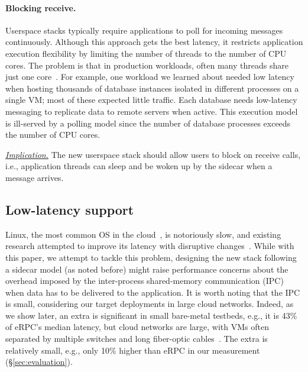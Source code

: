 \paragraph{Blocking receive.}
\label{par:blocking-receive}
Userspace stacks typically require applications to poll for incoming messages continuously.
Although this approach gets the best latency, it restricts application execution flexibility by limiting the number of threads to the number of CPU cores.
The problem is that in production workloads, often many threads share just one core~\cite{google-workload}.
For example, one workload we learned about needed low latency when hosting thousands of database instances isolated in different processes on a single VM; most of these expected little traffic.
Each database needs low-latency messaging to replicate data to remote servers when active.
This execution model is ill-served by a polling model since the number of database processes exceeds the number of CPU cores.

\ul{\textit{Implication.}} The new userspace stack should allow users to block on receive calls, i.e., application threads can sleep and be woken up by the sidecar when a message arrives.


\subsection{Low-latency support}
\label{subsec:low-latency}
Linux, the most common OS in the cloud~\cite{azure_smartnic}, is notoriously slow, and existing research attempted to improve its latency with disruptive changes~\cite{terabit-ethernet}.
While with this paper, we attempt to tackle this problem, designing the new stack following a sidecar model (as noted before) might raise performance concerns about the overhead imposed by the inter-process shared-memory communication (IPC) when data has to be delivered to the application.
It is worth noting that the IPC is small, considering our target deployments in large cloud networks.
Indeed, as we show later, an extra  is significant in small bare-metal testbeds, e.g., it is 43\% of eRPC's  median latency, but cloud networks are large, with VMs often separated by multiple switches and long fiber-optic cables~\cite{Guo:sigcomm16}.
The extra  is relatively small, e.g., only 10\% higher than eRPC in our measurement (\S\ref{sec:evaluation}).

